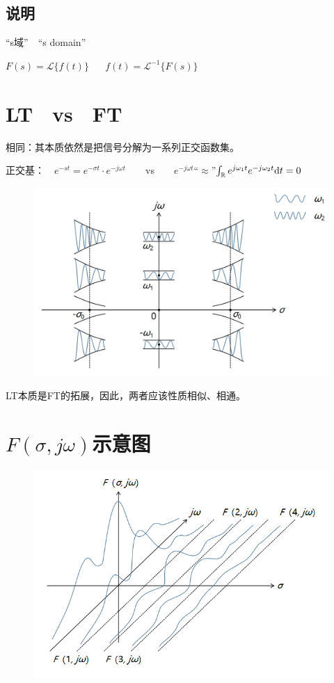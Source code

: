 \documentclass[UTF8]{ctexart}
\begin{document}
\subsection{说明}
“s域”$\quad$“s domain” \par
$F(s)=\mathscr{L}\{f(t)\}$ $\quad$ $f(t)=\mathscr{L}^{-1}\{F(s)\}$

\section{LT$\quad$vs$\quad$FT}
相同：其本质依然是把信号分解为一系列正交函数集。\par
正交基：$\quad{e^{-st}=e^{-\sigma{t}}\cdot{e^{-j\omega{t}}}}\qquad$vs$\qquad{e^{-j\omega{t}}}$“$\approx$”$\int_{\mathbb{R}}e^{j\omega_1{t}}e^{-j\omega_2{t}}{\rm{d}}t=0$\par
\begin{figure}[h]
    \centering
    \includegraphics[scale=0.35]{LTvsFT.png}
\end{figure}
LT本质是FT的拓展，因此，两者应该性质相似、相通。

\newpage
\section{$F(\sigma,j\omega)$示意图}
\begin{figure}[h]
    \centering
    \includegraphics[scale=0.7]{F示意图.png}
\end{figure}
\end{document}
